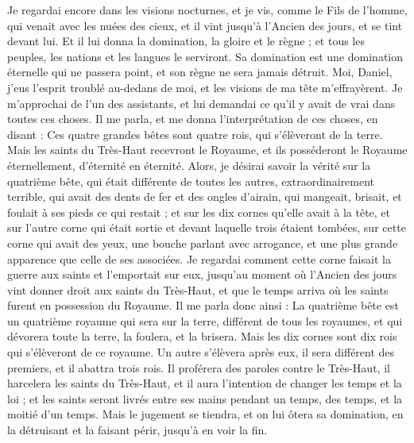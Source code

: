 \begin{multicols}{2}
Je regardai encore dans les visions nocturnes, et je vis, comme le Fils de l'homme, qui venait avec les nuées des cieux, et il vint jusqu'à l'Ancien des jours, et se tint devant lui.
Et il lui donna la domination, la gloire et le règne ; et tous les peuples, les nations et les langues le serviront. Sa domination est une domination éternelle qui ne passera point, et son règne ne sera jamais détruit.
Moi, Daniel, j'eus l'esprit troublé au-dedans de moi, et les visions de ma tête m'effrayèrent.
Je m'approchai de l'un des assistants, et lui demandai ce qu'il y avait de vrai dans toutes ces choses. Il me parla, et me donna l'interprétation de ces choses, en disant :
Ces quatre grandes bêtes sont quatre rois, qui s'élèveront de la terre.
Mais les saints du Très-Haut recevront le Royaume, et ils posséderont le Royaume éternellement, d'éternité en éternité.
Alors, je désirai savoir la vérité sur la quatrième bête, qui était différente de toutes les autres, extraordinairement terrible, qui avait des dents de fer et des ongles d'airain, qui mangeait, brisait, et foulait à ses pieds ce qui restait ;
et sur les dix cornes qu'elle avait à la tête, et sur l'autre corne qui était sortie et devant laquelle trois étaient tombées, sur cette corne qui avait des yeux, une bouche parlant avec arrogance, et une plus grande apparence que celle de ses associées.
Je regardai comment cette corne faisait la guerre aux saints et l'emportait sur eux,
jusqu'au moment où l'Ancien des jours vint donner droit aux saints du Très-Haut, et que le temps arriva où les saints furent en possession du Royaume.
Il me parla donc ainsi : La quatrième bête est un quatrième royaume qui sera sur la terre, différent de tous les royaumes, et qui dévorera toute la terre, la foulera, et la brisera.
Mais les dix cornes sont dix rois qui s'élèveront de ce royaume. Un autre s'élèvera après eux, il sera différent des premiers, et il abattra trois rois.
Il proférera des paroles contre le Très-Haut, il harcelera les saints du Très-Haut, et il aura l'intention de changer les temps et la loi ; et les saints seront livrés entre ses mains pendant un temps, des temps, et la moitié d'un temps.
Mais le jugement se tiendra, et on lui ôtera sa domination, en la détruisant et la faisant périr, jusqu'à en voir la fin.

\end{multicols}
